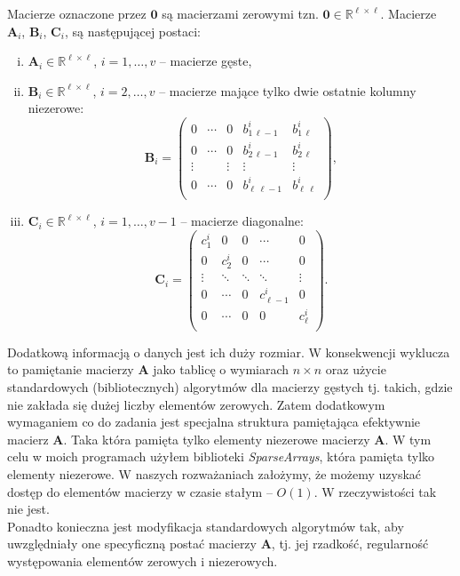 \documentclass[]{article}
\newcommand{\mA}{\bm{A}}
\newcommand{\mB}{\bm{B}}
\newcommand{\mC}{\bm{C}}
\newcommand{\mZ}{\bm{0}}
\newcommand{\R}{\mathbb{R}}
\begin{document}
	\noindent Macierze oznaczone przez $\mZ$ są macierzami zerowymi tzn. $\mZ \in \R^{\ell\times \ell}$. Macierze $\mA_i$, $\mB_i$, $\mC_i$, są następującej postaci:
	\begin{enumerate}[(i)]
		\item $\mA_i \in \R^{\ell\times \ell}$,   $i = 1, \ldots,v$ -- macierze gęste,
		\item $\mB_i \in \R^{\ell\times \ell}$,   $i = 2, \ldots,v$ -- macierze mające tylko dwie ostatnie kolumny niezerowe:
		$$
		\mB_i =
		\left(\begin{array}{ccccc}
		0 & \cdots & 0 & b_{1\,\ell-1}^i & b_{1\,\ell}^i \\
		0 & \cdots & 0 & b_{2\,\ell-1}^i & b_{2\,\ell}^i \\
		\vdots & & \vdots & \vdots & \vdots \\
		0 & \cdots & 0 & b_{\ell\,\ell-1}^i & b_{\ell\,\ell}^i \\
		\end{array}\right),
		$$
		\item $\mC_i \in \R^{\ell\times \ell}$,   $i = 1, \ldots,v\!-\!1$ -- macierze diagonalne:
		$$
		\mC_i =
		\left(\begin{array}{ccccc}
		c_{1}^i & 0 & 0 & \cdots & 0  \\
		0 &  c_{2}^i &  0 & \cdots & 0  \\
		\vdots &  \ddots &  \ddots & \ddots & \vdots  \\
		0 & \cdots & 0 &  c_{\ell-1}^i & 0 \\
		0 & \cdots & 0 &  0 & c_{\ell}^i \\
		\end{array}\right).
		$$
	\end{enumerate}

	Dodatkową informacją o danych jest ich duży rozmiar. W konsekwencji wyklucza to pamiętanie macierzy $\mA$ jako tablicę o wymiarach $n \times n$ oraz użycie standardowych (bibliotecznych) algorytmów dla macierzy gęstych tj. takich, gdzie
	nie zakłada się dużej liczby elementów zerowych. Zatem dodatkowym wymaganiem co do zadania jest specjalna struktura pamiętająca efektywnie macierz $\mA$. Taka która pamięta tylko elementy niezerowe macierzy $\mA$. W tym celu w moich programach użyłem biblioteki \textit{SparseArrays}, która pamięta tylko elementy niezerowe. W naszych rozważaniach założymy, że możemy uzyskać dostęp do elementów macierzy w czasie stałym -- $O(1)$. W rzeczywistości tak nie jest. \\
	Ponadto konieczna jest modyfikacja standardowych algorytmów tak, aby uwzględniały one specyficzną postać macierzy $\mA$, tj.
	jej rzadkość, regularność występowania elementów zerowych i niezerowych.\\
	
\end{document}
